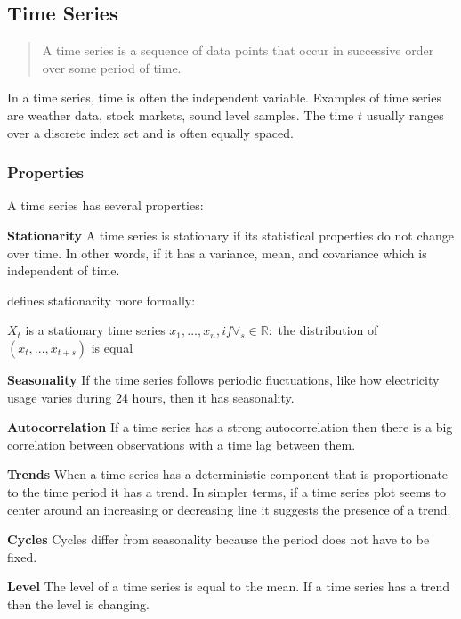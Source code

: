 \subsection{Time Series}
\label{sec:time-series}
\begin{quote}
    A time series is a sequence of data
    points that occur in successive order over some period of time.
\end{quote}
\cite{Hayes}

In a time series, time is often the independent variable.
Examples of time series are weather data, stock markets, sound level samples.
The time $t$ usually ranges over a discrete index set and is often equally spaced.

\subsubsection{Properties}
A time series has several properties:


\textbf{Stationarity}
A time series is stationary if its statistical properties do not change over time.
In other words, if it has a variance, mean, and covariance which is independent of time.

\cite{RobJHyndman2014} defines stationarity more formally:
\begin{definition}
   $X_t$ is a stationary time series 
   $x_1, ..., x_n, if \forall_s \in \mathbb{R} :$
   the distribution of $(x_t, ..., x_{t+s})$ is equal
\end{definition}

\textbf{Seasonality}
If the time series follows periodic fluctuations, like how electricity usage varies during 24 hours,
then it has seasonality.

\textbf{Autocorrelation}
If a time series has a strong autocorrelation then there is a big
correlation between observations with a time lag between them.

\textbf{Trends}
When a time series has a deterministic component that is proportionate to the time period it has a trend.
In simpler terms, if a time series plot seems to center around an increasing or decreasing line it suggests the presence of a trend.

\textbf{Cycles}
Cycles differ from seasonality because the period does not have to be fixed.


\textbf{Level}
The level of a time series is equal to the mean. If a time series has a trend
then the level is changing.







